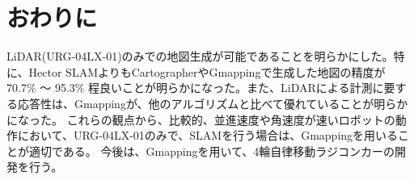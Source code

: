 \clearpage

\section{おわりに}
LiDAR(URG-04LX-01)のみでの地図生成が可能であることを明らかにした。特に、Hector SLAMよりもCartographerやGmappingで生成した地図の精度が 70.7\% ～ 95.3\%
程良いことが明らかになった。また、LiDARによる計測に要する応答性は、Gmappingが、他のアルゴリズムと比べて優れていることが明らかになった。
これらの観点から、比較的、並進速度や角速度が速いロボットの動作において、URG-04LX-01のみで、SLAMを行う場合は、Gmappingを用いることが適切である。
今後は、Gmappingを用いて、4輪自律移動ラジコンカーの開発を行う。